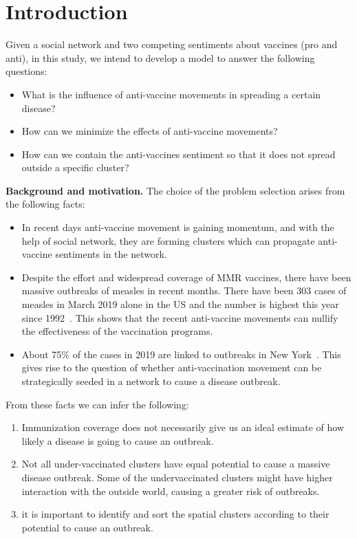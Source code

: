 \section{Introduction}

Given a social network and two competing sentiments about vaccines (pro and anti), in this study, we intend to develop a model to answer the following questions:

\begin{itemize}
    \item What is the influence of anti-vaccine movements in spreading a certain disease?
    \item How can we minimize the effects of anti-vaccine movements?
    \item How can we contain the anti-vaccines sentiment so that it does not spread outside a specific cluster? 
\end{itemize}


\noindent
\textbf{Background and motivation.} The choice of the problem selection arises from the following facts:

\begin{itemize}
    \item In recent days anti-vaccine movement is gaining momentum, and with the help of social network, they are forming clusters which can propagate anti-vaccine sentiments in the network.

    \item Despite the effort and widespread coverage of MMR vaccines, there have been massive outbreaks of measles in recent months. There have been 303 cases of measles in March 2019 alone in the US and the number is highest this year since 1992~\cite{cdc_measles}. This shows that the recent anti-vaccine movements can nullify the effectiveness of the vaccination programs.
    
    \item About 75\% of the cases in 2019 are linked to outbreaks in New York~\cite{rockland_measles}. This gives rise to the question of whether anti-vaccination movement can be strategically seeded in a network to cause a disease outbreak.

\end{itemize}

From these facts we can infer the following:
\begin{enumerate}
    \item Immunization coverage does not necessarily give us an ideal estimate of how likely a disease is going to cause an outbreak.
    
    \item Not all under-vaccinated clusters have equal potential to cause a massive disease outbreak. Some of the undervaccinated clusters might have higher interaction with the outside world, causing a greater risk of outbreaks.
    
    \item it is important to identify and sort the spatial clusters according to their potential to cause an outbreak.
\end{enumerate}


